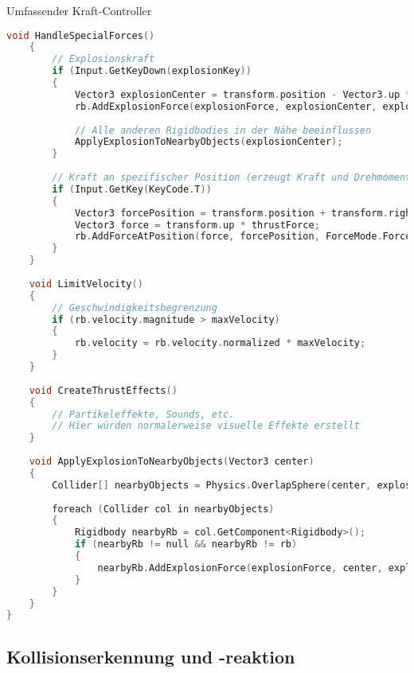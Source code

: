 \begin{code}{Umfassender Kraft-Controller}
\begin{lstlisting}[language=C, style=basesmol]
    void HandleSpecialForces() 
    {
        // Explosionskraft
        if (Input.GetKeyDown(explosionKey)) 
        {
            Vector3 explosionCenter = transform.position - Vector3.up * 2f;
            rb.AddExplosionForce(explosionForce, explosionCenter, explosionRadius, 3f);
            
            // Alle anderen Rigidbodies in der Nähe beeinflussen
            ApplyExplosionToNearbyObjects(explosionCenter);
        }
        
        // Kraft an spezifischer Position (erzeugt Kraft und Drehmoment)
        if (Input.GetKey(KeyCode.T)) 
        {
            Vector3 forcePosition = transform.position + transform.right;
            Vector3 force = transform.up * thrustForce;
            rb.AddForceAtPosition(force, forcePosition, ForceMode.Force);
        }
    }
    
    void LimitVelocity() 
    {
        // Geschwindigkeitsbegrenzung
        if (rb.velocity.magnitude > maxVelocity) 
        {
            rb.velocity = rb.velocity.normalized * maxVelocity;
        }
    }
    
    void CreateThrustEffects() 
    {
        // Partikeleffekte, Sounds, etc.
        // Hier würden normalerweise visuelle Effekte erstellt
    }
    
    void ApplyExplosionToNearbyObjects(Vector3 center) 
    {
        Collider[] nearbyObjects = Physics.OverlapSphere(center, explosionRadius);
        
        foreach (Collider col in nearbyObjects) 
        {
            Rigidbody nearbyRb = col.GetComponent<Rigidbody>();
            if (nearbyRb != null && nearbyRb != rb) 
            {
                nearbyRb.AddExplosionForce(explosionForce, center, explosionRadius);
            }
        }
    }
}
\end{lstlisting}
\end{code}

\subsection{Kollisionserkennung und -reaktion}

